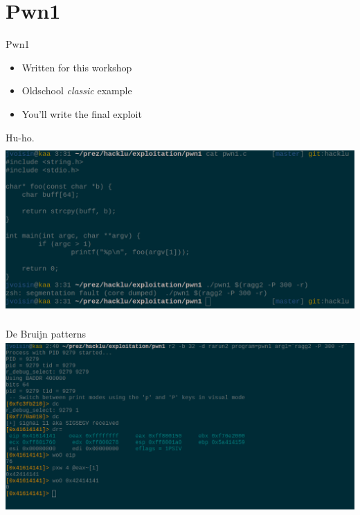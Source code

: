 \documentclass[10pt, compress]{beamer}
\begin{document}
\section{Pwn1}
\begin{frame}{Pwn1}
	\begin{itemize}
		\item Written for this workshop
		\item Oldschool \emph{classic} example
		\item You'll write the final exploit
	\end{itemize}
\end{frame}

\begin{frame}{Hu-ho.}
	\includegraphics[width=\textwidth,height=6.5cm]{segfault_pwn1.png}
\end{frame}

\begin{frame}{De Bruijn patterns}
	\includegraphics[width=\textwidth,height=6.5cm]{bruijn.png}
\end{frame}
\end{document}
